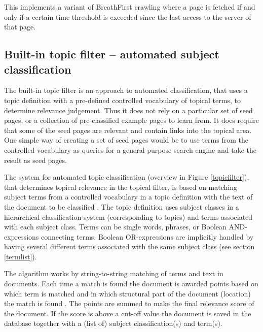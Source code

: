 This implements a variant of BreathFirst crawling where a page is fetched if and only if 
a certain time threshold is exceeded 
since the last access to the server of that page.

\subsection{Built-in topic filter -- automated subject classification}
\label{autoclass}
The built-in topic filter is an approach to automated classification,
that uses a topic definition with a pre-defined controlled vocabulary of
topical terms, to determine relevance judgement. Thus it does not rely
on a particular set of seed pages, or a collection of pre-classified
example pages to learn from. It does require that some of the seed pages
are relevant and contain links into the topical area.
One simple way of creating a set of seed pages would be to use terms
from the controlled vocabulary as queries for a general-purpose search
engine and take the result as seed pages.

The system for automated topic classification (overview in Figure \ref{topicfilter}), that determines
topical relevance in the topical filter, is based on matching subject
terms from a controlled vocabulary in a topic
definition with the text of the document to be classified
\cite{ardo99:_online99}. The topic definition uses
subject classes in a hierarchical classification system (corresponding
to topics) and terms
associated with each subject class. Terms can be single words, phrases,
 or Boolean AND-expressions connecting terms.
Boolean OR-expressions are implicitly handled by having several
different terms associated with the same subject class (see section \ref{termlist}).

The algorithm works by string-to-string matching of terms and
text in documents.
Each time a match is found the document is awarded points based on
which term is matched and in which structural part of the document
(location) the match is found \cite{ardo05:_ECDL}.  The points are summed to make the final
relevance score of the document. If the score is above a cut-off value the
document is saved in the database together with a (list of) subject
classification(s) and term(s).

